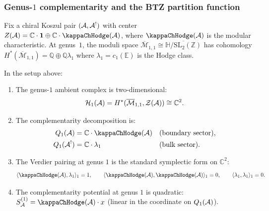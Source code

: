 \subsubsection{Genus-$1$ complementarity and the BTZ
partition function}

\begin{setup}
Fix a chiral Koszul pair $(\mathcal{A}, \mathcal{A}^!)$ with center
$Z(\cA) = \mathbb{C} \cdot \mathbf{1} \oplus
\mathbb{C} \cdot \kappaChHodge(\cA)$, where $\kappaChHodge(\cA)$ is the
modular characteristic.
At genus~$1$, the moduli space
$\overline{\mathcal{M}}_{1,1} \cong \overline{\mathbb{H}/\mathrm{SL}_2(\mathbb{Z})}$
has cohomology
$H^*(\overline{\mathcal{M}}_{1,1})
= \mathbb{Q} \oplus \mathbb{Q}\lambda_1$
where $\lambda_1 = c_1(\mathbb{E})$ is the Hodge class.
\end{setup}

\begin{theorem}
In the setup above:
\begin{enumerate}[label=\textup{(\roman*)}]
\item The genus-$1$ ambient complex is two-dimensional:
 \begin{equation}%
 \mathcal{H}_1(\cA)
 = H^*(\overline{\mathcal{M}}_{1,1}, \mathcal{Z}(\cA))
 \cong \mathbb{C}^2.
 \end{equation}

\item The complementarity decomposition is:
 \begin{align}
 Q_1(\cA) &= \mathbb{C} \cdot \kappaChHodge(\cA)
 &&\text{\textup{(}boundary sector\textup{)}},
 \\
 Q_1(\cA^!) &= \mathbb{C} \cdot \lambda_1
 &&\text{\textup{(}bulk sector\textup{)}}.
 \end{align}

\item The Verdier pairing at genus $1$ is the standard
 symplectic form on $\mathbb{C}^2$:
 \begin{equation}%
 \langle \kappaChHodge(\cA), \lambda_1 \rangle_1 = 1,
 \qquad
 \langle \kappaChHodge(\cA), \kappaChHodge(\cA) \rangle_1 = 0,
 \qquad
 \langle \lambda_1, \lambda_1 \rangle_1 = 0.
 \end{equation}

\item The complementarity potential at genus $1$ is quadratic:
 $S_\cA^{(1)} = \kappaChHodge(\cA) \cdot x$
 \textup{(}linear in the coordinate on $Q_1(\mathcal{A})$\textup{)}.
\end{enumerate}
\end{theorem}

